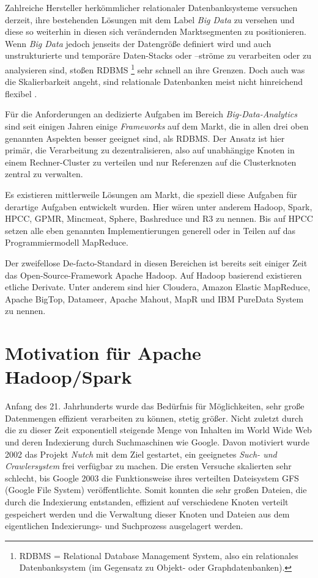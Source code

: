 Zahlreiche Hersteller herkömmlicher relationaler Datenbanksysteme versuchen derzeit, ihre bestehenden Lösungen mit dem Label \textit{Big Data} zu versehen und diese so weiterhin in diesen sich verändernden Marktsegmenten zu positionieren. Wenn \textit{Big Data} jedoch jenseits der Datengröße definiert wird und auch unstrukturierte und temporäre Daten-Stacks oder –ströme zu verarbeiten oder zu analysieren sind, stoßen RDBMS \footnote{RDBMS = Relational Database Management System, also ein relationales Datenbanksystem (im Gegensatz zu Objekt- oder Graphdatenbanken).} sehr schnell an ihre Grenzen. Doch auch was die Skalierbarkeit angeht, sind relationale Datenbanken meist nicht hinreichend flexibel . 

Für die Anforderungen an dedizierte Aufgaben im Bereich \textit{Big-Data-Analytics} sind seit einigen Jahren einige \textit{Frameworks} auf dem Markt, die in allen drei oben genannten Aspekten besser geeignet sind, als RDBMS. Der Ansatz ist hier primär, die Verarbeitung zu dezentralisieren, also auf unabhängige Knoten in einem Rechner-Cluster zu verteilen und nur Referenzen auf die Clusterknoten zentral zu verwalten.  

Es existieren mittlerweile Lösungen am Markt, die speziell diese Aufgaben für derartige Aufgaben entwickelt wurden. Hier wären unter anderem Hadoop, Spark, HPCC, GPMR, Mincmeat, Sphere, Bashreduce und R3 zu nennen. Bis auf HPCC setzen alle eben genannten Implementierungen generell oder in Teilen auf das Programmiermodell MapReduce. 

Der zweifellose De-facto-Standard in diesen Bereichen ist bereits seit einiger Zeit das Open-Source-Framework Apache Hadoop. Auf Hadoop basierend existieren etliche Derivate. Unter anderem sind hier Cloudera, Amazon Elastic MapReduce, Apache BigTop, Datameer, Apache Mahout, MapR und IBM PureData System zu nennen. 



	





\section{Motivation für Apache Hadoop/Spark}
\label{section:motivation für Apache Hadoop/Spark}

Anfang des 21. Jahrhunderts wurde das Bedürfnis für Möglichkeiten, sehr große Datenmengen effizient verarbeiten zu können, stetig größer. Nicht zuletzt durch die zu dieser Zeit exponentiell steigende Menge von Inhalten im World Wide Web und deren Indexierung durch Suchmaschinen wie Google. Davon motiviert wurde 2002 das Projekt \textit{Nutch} mit dem Ziel gestartet, ein geeignetes \textit{Such- und Crawlersystem} frei verfügbar zu machen. Die ersten Versuche skalierten sehr schlecht, bis Google 2003 die Funktionsweise ihres verteilten Dateisystem GFS (Google File System) veröffentlichte. Somit konnten die sehr großen Dateien, die durch die Indexierung entstanden, effizient auf verschiedene Knoten verteilt gespeichert werden und die Verwaltung dieser Knoten und Dateien aus dem eigentlichen Indexierungs- und Suchprozess ausgelagert werden. 

